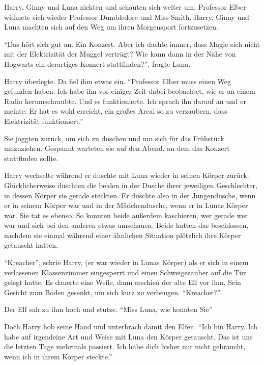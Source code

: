 Harry, Ginny und Luna nickten und schauten sich weiter um. Professor Elber widmete sich wieder Professor Dumbledore und Miss Smith. Harry, Ginny und Luna machten sich auf den Weg um ihren Morgensport fortzusetzen.

\enquote{Das hört sich gut an. Ein Konzert. Aber ich dachte immer, dass Magie sich nicht mit der Elektrizität der Muggel verträgt? Wie kann dann in der Nähe von Hogwarts ein derartiges Konzert stattfinden?}, fragte Luna.

Harry überlegte. Da  fiel ihm etwas ein. \enquote{Professor Elber muss einen Weg gefunden haben. Ich habe ihn vor einiger Zeit dabei beobachtet, wie er an einem Radio herumschraubte. Und es funktionierte. Ich sprach ihn darauf an und er meinte:  Er hat es wohl erreicht, ein großes Areal so zu verzaubern, dass Elektrizität funktioniert.}

Sie joggten zurück, um sich zu duschen und um sich für das Frühstück umzuziehen. Gespannt warteten sie auf den Abend, an dem das Konzert stattfinden sollte.

Harry wechselte während er duschte mit Luna wieder in seinen Körper zurück. Glücklicherweise duschten die beiden in der Dusche ihrer jeweiligen Geschlechter, in dessen Körper sie gerade steckten. Er duschte also in der Jungendusche, wenn er in seinem Körper war und in der Mädchendusche, wenn er in Lunas Körper war. Sie tat es ebenso. So konnten beide außerdem kaschieren, wer gerade wer war und sich bei den anderen etwas umschauen. Beide hatten das beschlossen, nachdem sie einmal während einer ähnlichen Situation plötzlich ihre Körper getauscht hatten.

\trenn

\enquote{Kreacher}, schrie Harry, (er war wieder in Lunas Körper) als er sich in einem verlassenen Klassenzimmer eingesperrt und einen Schweigezauber auf die Tür gelegt hatte. Es dauerte eine Weile, dann erschien der alte Elf vor ihm. Sein Gesicht zum Boden gesenkt, um sich kurz zu verbeugen. \enquote{Kreacher?}

Der Elf sah zu ihm hoch und stutze. \enquote{Miss Luna, wie konnten Sie\abs}

Doch Harry hob seine Hand und unterbrach damit den Elfen. \enquote{Ich bin Harry. Ich habe auf irgendeine Art und Weise mit Luna den Körper getauscht. Das ist uns die letzten Tage mehrmals passiert. Ich habe dich bisher nur nicht gebraucht, wenn ich in ihrem Körper steckte.}

